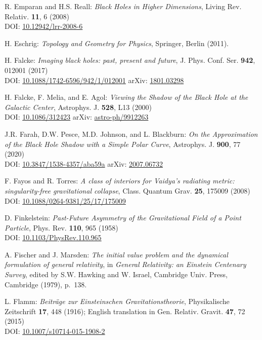 \begin{thebibliography}{123}
R. Emparan and H.S. Reall:
{\em Black Holes in Higher Dimensions},
Living Rev. Relativ. {\bf 11}, 6 (2008)\\
DOI: \href{https://doi.org/10.12942/lrr-2008-6}{10.12942/lrr-2008-6}

H. Eschrig: {\em Topology and Geometry for Physics},
Springer, Berlin (2011).

H. Falcke:
{\em Imaging black holes: past, present and future},
J. Phys. Conf. Ser. {\bf 942}, 012001 (2017)\\
DOI: \href{https://doi.org/10.1088/1742-6596/942/1/012001}{10.1088/1742-6596/942/1/012001}\hfill
arXiv: \href{https://arxiv.org/abs/1801.03298}{1801.03298}

H. Falcke, F. Melia, and E. Agol:
{\em Viewing the Shadow of the Black Hole at the Galactic Center},
Astrophys. J. {\bf 528}, L13 (2000)\\
DOI: \href{https://doi.org/10.1086/312423}{10.1086/312423}\hfill
arXiv: \href{https://arxiv.org/abs/astro-ph/9912263}{astro-ph/9912263}

J.R. Farah, D.W. Pesce, M.D. Johnson, and L. Blackburn:
{\em On the Approximation of the Black Hole Shadow with a Simple Polar Curve},
Astrophys. J. {\bf 900}, 77 (2020)\\
DOI: \href{https://doi.org/10.3847/1538-4357/aba59a}{10.3847/1538-4357/aba59a}\hfill
arXiv: \href{https://arxiv.org/abs/2007.06732}{2007.06732}

F. Fayos and R. Torres:
{\em A class of interiors for Vaidya's radiating metric: singularity-free gravitational collapse},
Class. Quantum Grav. {\bf 25}, 175009 (2008)\\
DOI: \href{https://doi.org/10.1088/0264-9381/25/17/175009}{10.1088/0264-9381/25/17/175009}

D. Finkelstein:
{\em Past-Future Asymmetry of the Gravitational Field of a Point Particle},
Phys. Rev. {\bf 110}, 965 (1958)\\
DOI: \href{https://doi.org/10.1103/PhysRev.110.965}{10.1103/PhysRev.110.965}

A. Fischer and J. Marsden:
{\em The initial value problem and the dynamical formulation of general relativity},
in {\em General Relativity: an Einstein
Centenary Survey}, edited by S.W. Hawking and W. Israel,
Cambridge Univ. Press, Cambridge (1979), p.~138.

L. Flamm: {\em Beiträge zur Einsteinschen Gravitationstheorie},
Physikalische Zeitschrift {\bf 17}, 448 (1916); English translation in
Gen. Relativ. Gravit. {\bf 47}, 72 (2015)\\
DOI: \href{https://doi.org/10.1007/s10714-015-1908-2}{10.1007/s10714-015-1908-2}


\end{thebibliography}
